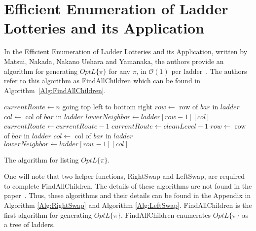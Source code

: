 \section{Efficient Enumeration of Ladder Lotteries and its Application}

In the Efficient Enumeration of Ladder Lotteries and its Application, written by Matsui, Nakada, Nakano Uehara and Yamanaka,
the authors provide an algorithm for generating $OptL\{\pi\}$ 
for any $\pi$, in $\mathcal{O}(1)$ per ladder~\cite{A1}. The authors refer to this algorithm as {\sc FindAllChildren}
which can be found in Algorithm~\ref{Alg:FindAllChildren}. 
\begin{algorithm}[!htp]
	\begin{algorithmic}[1]
			\State $currentRoute \gets n$
				\State going top left to bottom right 
					\State $row \gets$ row of $bar$ in $ladder$ 
					\State $col \gets$ col of $bar$ in $ladder$
					\State $lowerNeighbor \gets ladder[row-1][col]$
					\EndIf
				\EndFor
				\State $currentRoute \gets currentRoute-1$
			\EndWhile
			\State $currentRoute \gets cleanLevel-1$
				\State $row \gets$ row of $bar$ in $ladder$ 
				\State $col \gets$ col of $bar$ in $ladder$
				\State $lowerNeighbor \gets ladder[row-1][col]$
				\EndIf
			\EndFor
		\EndFunction
	\end{algorithmic}
	\caption{The algorithm for listing $OptL\{\pi\}$.}
	\label{Alg:FindAllChildren}
\end{algorithm}
\pagebreak

One will note that two helper functions, {\sc RightSwap} and {\sc LeftSwap}, are required to complete 
{\sc FindAllChildren}. The details of these algorithms are not found 
in the paper~\cite{A1}. Thus, these algorithms and their details can be found in the Appendix in Algorithm \ref{Alg:RightSwap}
and Algorithm \ref{Alg:LeftSwap}.
{\sc FindAllChildren} is the first algorithm for generating $OptL\{\pi\}$.\newline
{\sc FindAllChildren} enumerates $OptL\{\pi\}$ as a tree of ladders.

